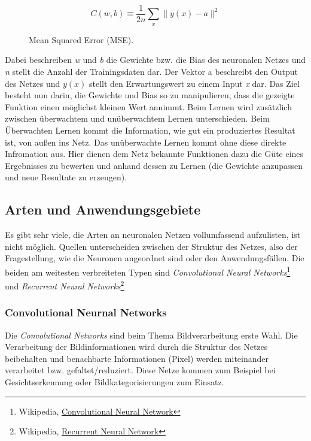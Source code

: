 \begin{figure}[H]
    \centering
    \[ C(w, b) \equiv
          \frac{1}{2n}\displaystyle\sum_{x}{\parallel y(x) - a\parallel^2}
    \]
    \caption{Mean Squared Error (MSE).}
    \label{fig:learn-function}
\end{figure}

Dabei beschreiben \textit{w} und \textit{b} die Gewichte bzw. die Bias des neuronalen Netzes und \textit{n} stellt die Anzahl der Trainingsdaten
dar. Der Vektor a beschreibt den Output des Netzes und \textit{\(y(x)\)} stellt den Erwartungswert zu einem Input \textit{x} dar.
Das Ziel besteht nun darin, die Gewichte und Bias so zu manipulieren, dass die gezeigte Funktion einen möglichst kleinen
Wert annimmt.
Beim Lernen wird zusätzlich zwischen überwachtem und unüberwachtem Lernen unterschieden. Beim Überwachten Lernen kommt die Information, wie gut ein produziertes Resultat ist, von außen ins Netz. Das unüberwachte Lernen kommt ohne diese direkte Infromation aus. Hier dienen dem Netz bekannte Funktionen dazu die Güte eines Ergebnisses zu bewerten und anhand dessen zu Lernen (die Gewichte anzupassen und neue Resultate zu erzeugen).

\subsection{Arten und Anwendungsgebiete}

Es gibt sehr viele, die Arten an neuronalen Netzen vollumfassend aufzulisten, ist nicht möglich. Quellen unterscheiden zwischen der Struktur des Netzes, also der Fragestellung, wie die Neuronen angeordnet sind oder den Anwendungsfällen. Die beiden am weitesten verbreiteten Typen sind \textit{Convolutional Neural Networks}\footnote{Wikipedia, \href{https://de.wikipedia.org/wiki/Convolutional\_Neural\_Network}{Convolutional Neural Network}} und \textit{Recurrent Neural Networks}\footnote{Wikipedia, \href{https://en.wikipedia.org/wiki/Recurrent\_neural\_network}{Recurrent Neural Network}}

\subsubsection*{Convolutional Neurnal Networks}

Die \textit{Convolutional Networks} sind beim Thema Bildverarbeitung erste Wahl. Die Verarbeitung der Bildinformationen wird durch die Struktur des Netzes beibehalten und benachbarte Informationen (Pixel) werden miteinander verarbeitet bzw. gefaltet/reduziert. Diese Netze kommen zum Beispiel bei Gesichtserkennung oder Bildkategorisierungen zum Einsatz.

